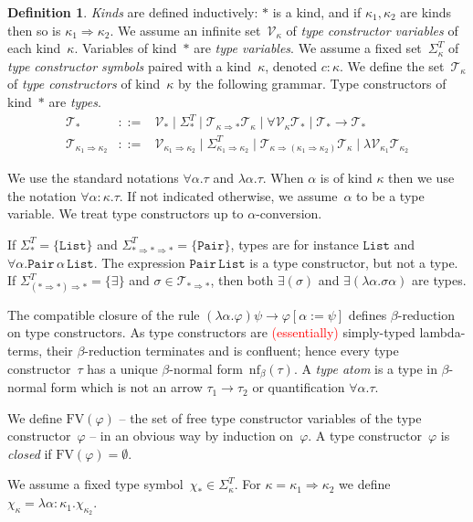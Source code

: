 \documentclass[a4paper,UKenglish,cleveref,autoref,numberwithinsect]{lipics-v2019}
\theoremstyle{definition}
\newtheorem{defn}[theorem]{Definition}
\newcommand{\arrkind}{\Rightarrow}
\newcommand{\arrtype}{\rightarrow}
\newcommand{\FV}{\mathrm{FV}}
\newcommand{\Tc}{\mathcal{T}}
\newcommand{\Vc}{\mathcal{V}}
\newcommand{\nf}{\mathrm{nf}}
\newcommand{\List}{\mathtt{List}}
\newcommand{\Pair}{\mathtt{Pair}}
\newcommand{\LCchange}[1]{\textcolor{red}{#1}}
\begin{document}
\begin{defn}\label{def_types}
  \emph{Kinds} are defined inductively: $*$ is a kind, and if
  $\kappa_1,\kappa_2$ are kinds then so is $\kappa_1 \arrkind
  \kappa_2$. We assume an infinite set~$\Vc_\kappa$ of \emph{type
    constructor variables} of each kind~$\kappa$. Variables of
  kind~$*$ are \emph{type variables}. We assume a fixed
  set~$\Sigma^T_\kappa$ of \emph{type constructor symbols} paired with a
  kind~$\kappa$, denoted $c : \kappa$.
  We define the set~$\Tc_\kappa$ of \emph{type constructors} of
  kind~$\kappa$ by the following grammar.
  Type constructors of kind~$*$ are \emph{types}.
  \[
  \begin{array}{rcl}
    \Tc_{*} &::=& \Vc_{*}
    \mid \Sigma^T_{*} \mid
    \Tc_{\kappa\arrkind *}\Tc_{\kappa} \mid \forall\Vc_\kappa\Tc_* \mid \Tc_*\arrtype\Tc_* \\
    \Tc_{\kappa_1\arrkind\kappa_2} &::=& \Vc_{\kappa_1\arrkind\kappa_2}
    \mid \Sigma^T_{\kappa_1\arrkind\kappa_2} \mid
    \Tc_{\kappa\arrkind(\kappa_1\arrkind\kappa_2)}\Tc_{\kappa} \mid \lambda \Vc_{\kappa_1} \Tc_{\kappa_2}
  \end{array}
  \]

  We use the standard notations $\forall \alpha . \tau$ and $\lambda
  \alpha . \tau$. When $\alpha$ is of kind $\kappa$ then we use the
  notation $\forall \alpha : \kappa . \tau$. If not indicated
  otherwise, we assume~$\alpha$ to be a type variable. We treat type
  constructors up to $\alpha$-conversion.

  \begin{example}
  If $\Sigma^T_{*} = \{ \List \}$ and $\Sigma^T_{* \arrkind * \arrkind
  *} = \{ \Pair \}$, types are for instance $\List$ and
  $\forall \alpha.\Pair\,\alpha\,\List$.  The expression
  $\Pair\,\List$ is a type constructor, but not a type.  If
  $\Sigma^T_{(* \arrkind *) \arrkind *} = \{ \exists \}$ and
  $\sigma \in \Tc_{* \arrkind *}$, then both
  $\exists(\sigma)$ and $\exists (\lambda \alpha.\sigma\alpha)$ are
  types.
  \end{example}

  The compatible closure of the rule $(\lambda\alpha.\varphi)\psi \to
  \varphi[\alpha := \psi]$ defines $\beta$-reduction on type
  constructors. As type constructors are \LCchange{(essentially)} simply-typed
  lambda-terms, their $\beta$-reduction
  terminates
  and is confluent; hence every type constructor~$\tau$ has a unique
  $\beta$-normal form~$\nf_\beta(\tau)$. A \emph{type atom} is a type
  in $\beta$-normal form which is not an arrow $\tau_1\arrtype\tau_2$
  or quantification $\forall\alpha.\tau$.

  We define $\FV(\varphi)$ -- the set of free type constructor
  variables of the type constructor~$\varphi$ -- in an obvious way by
  induction on~$\varphi$. A type constructor~$\varphi$ is
  \emph{closed} if $\FV(\varphi) = \emptyset$.

  We assume a fixed type symbol~$\chi_* \in
  \Sigma^T_\kappa$. For $\kappa=\kappa_1\arrkind\kappa_2$ we define
  $\chi_\kappa = \lambda \alpha:\kappa_1 . \chi_{\kappa_2}$.
\end{defn}
\end{document}
